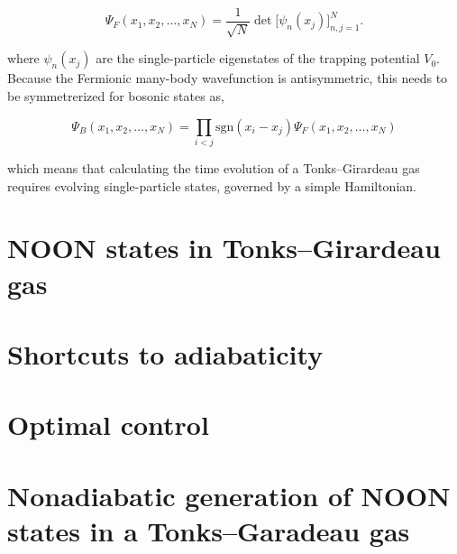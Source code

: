 \begin{equation}
\Psi_F (x_1, x_2, \ldots, x_N) = \frac{1}{\sqrt{N}} \det\Big[\psi_n(x_j)\Big]_{n,j=1}^N.
\end{equation}

\noindent where $\psi_n(x_j)$ are the single-particle eigenstates of the trapping potential $V_0$.
Because the Fermionic many-body wavefunction is antisymmetric, this needs to be symmetrerized for bosonic states as, 

\begin{equation}
\Psi_B(x_1, x_2, \ldots, x_N) =
\prod_{i < j}
\mathrm{sgn}(x_i - x_j)\Psi_F(x_1, x_2, \ldots, x_N)
\end{equation}

\noindent which means that calculating the time evolution of a Tonks--Girardeau gas requires evolving single-particle states, governed by a simple Hamiltonian.


\section{NOON states in Tonks--Girardeau gas}

\section{Shortcuts to adiabaticity}
\section{Optimal control}


\section{Nonadiabatic generation of NOON states in a Tonks--Garadeau gas}
